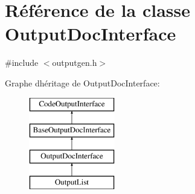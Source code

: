 \hypertarget{class_output_doc_interface}{}\section{Référence de la classe Output\+Doc\+Interface}
\label{class_output_doc_interface}


{\ttfamily \#include $<$outputgen.\+h$>$}

Graphe d\textquotesingle{}héritage de Output\+Doc\+Interface\+:\begin{figure}[H]
\begin{center}
\leavevmode
\includegraphics[height=4.000000cm]{class_output_doc_interface}
\end{center}
\end{figure}

